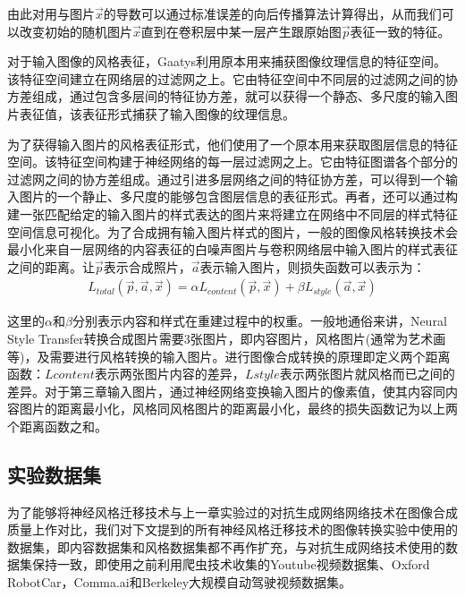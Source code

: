 由此对用与图片$\vec{x}$的导数可以通过标准误差的向后传播算法计算得出，从而我们可以改变初始的随机图片$\vec{x}$直到在卷积层中某一层产生跟原始图$\vec{p}$表征一致的特征。

对于输入图像的风格表征，Gaatys利用原本用来捕获图像纹理信息的特征空间。该特征空间建立在网络层的过滤网之上。它由特征空间中不同层的过滤网之间的协方差组成，通过包含多层间的特征协方差，就可以获得一个静态、多尺度的输入图片表征值，该表征形式捕获了输入图像的纹理信息。

为了获得输入图片的风格表征形式，他们使用了一个原本用来获取图层信息的特征空间。该特征空间构建于神经网络的每一层过滤网之上。它由特征图谱各个部分的过滤网之间的协方差组成。通过引进多层网络之间的特征协方差，可以得到一个输入图片的一个静止、多尺度的能够包含图层信息的表征形式。再者，还可以通过构建一张匹配给定的输入图片的样式表达的图片来将建立在网络中不同层的样式特征空间信息可视化。为了合成拥有输入图片样式的图片，一般的图像风格转换技术会最小化来自一层网络的内容表征的白噪声图片与卷积网络层中输入图片的样式表征之间的距离。让$\overrightarrow{p}$表示合成照片，$\overrightarrow{a}$表示输入图片，则损失函数可以表示为：
\begin{align}
    L_{total}(\overrightarrow{p},\overrightarrow{a}, \overrightarrow{x})=
    \alpha L_{content}(\overrightarrow{p}, \overrightarrow{x}) +
    \beta L_{style}(\overrightarrow{a}, \overrightarrow{x})
\end{align}

这里的$\alpha$和$\beta$分别表示内容和样式在重建过程中的权重。一般地通俗来讲，Neural Style Transfer转换合成图片需要3张图片，即内容图片，风格图片(通常为艺术画等)，及需要进行风格转换的输入图片。进行图像合成转换的原理即定义两个距离函数：$Lcontent$表示两张图片内容的差异，$Lstyle$表示两张图片就风格而已之间的差异。对于第三章输入图片，通过神经网络变换输入图片的像素值，使其内容同内容图片的距离最小化，风格同风格图片的距离最小化，最终的损失函数记为以上两个距离函数之和。 

\subsection{实验数据集}

为了能够将神经风格迁移技术与上一章实验过的对抗生成网络网络技术在图像合成质量上作对比，我们对下文提到的所有神经风格迁移技术的图像转换实验中使用的数据集，即内容数据集和风格数据集都不再作扩充，与对抗生成网络技术使用的数据集保持一致，即使用之前利用爬虫技术收集的Youtube视频数据集、Oxford RobotCar\cite{ds:oxford}，Comma.ai\cite{ds:ai}和Berkeley大规模自动驾驶视频数据集\cite{ds:berkeley}。

